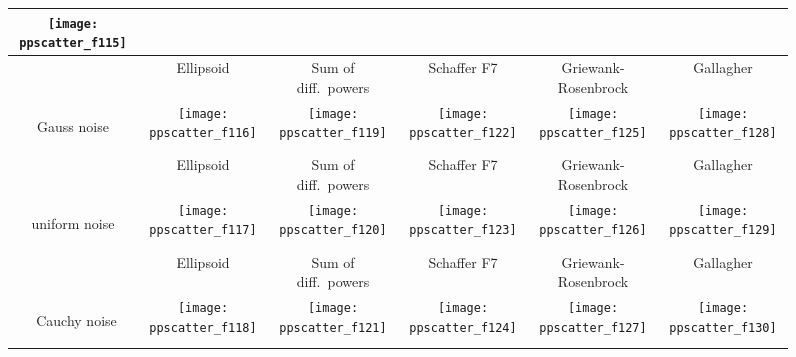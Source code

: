 \documentclass{sig-alternate}
\begin{document}
\begin{figure*}
\begin{tabular}{@{}c@{}*{5}{@{}c@{}}}
    \texttt{[image: ppscatter\_f115]}\\\hline
 & { Ellipsoid} & { Sum of diff.\ powers} & { Schaffer F7} & { Griewank-Rosenbrock} & { Gallagher}\\
\begin{turn}{90}\parbox{0.175\textwidth}{\centering\sf Gauss noise}\end{turn} &
    \texttt{[image: ppscatter\_f116]}&
    \texttt{[image: ppscatter\_f119]}&
    \texttt{[image: ppscatter\_f122]}&
    \texttt{[image: ppscatter\_f125]}&
    \texttt{[image: ppscatter\_f128]}\\
 & { Ellipsoid} & { Sum of diff.\ powers} & { Schaffer F7} & { Griewank-Rosenbrock} & { Gallagher}\\
\begin{turn}{90}\parbox{0.175\textwidth}{\centering\sf uniform noise}\end{turn} &
    \texttt{[image: ppscatter\_f117]}&
    \texttt{[image: ppscatter\_f120]}&
    \texttt{[image: ppscatter\_f123]}&
    \texttt{[image: ppscatter\_f126]}&
    \texttt{[image: ppscatter\_f129]}\\
& { Ellipsoid} & { Sum of diff.\ powers} & { Schaffer F7} & { Griewank-Rosenbrock} & { Gallagher}\\
\begin{turn}{90}\parbox{0.175\textwidth}{~\centering\sf Cauchy noise}\end{turn} &
    \texttt{[image: ppscatter\_f118]}&
    \texttt{[image: ppscatter\_f121]}&
    \texttt{[image: ppscatter\_f124]}&
    \texttt{[image: ppscatter\_f127]}&
    \texttt{[image: ppscatter\_f130]}
\end{tabular}
\caption{\label{fig:scatterplots}
}
\end{figure*}
\end{document}
